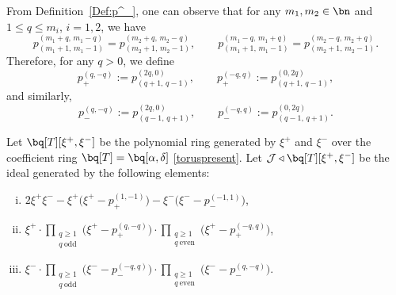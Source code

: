 \documentclass[10pt, a4paper, reqno]{amsart}
\begin{document}
%
%
%





	From Definition~\ref{Def:p^_}, one can observe that for any $m_1, m_2 \in \bn$ and $1 \leq q \leq m_i$, $i = 1, 2$, we have  
	\[
	p^{(m_1+q,\,m_1-q)}_{(m_1+1,\,m_1-1)} = p^{(m_2+q,\,m_2-q)}_{(m_2+1,\,m_2-1)}, 
	\qquad 
	p^{(m_1-q,\,m_1+q)}_{(m_1+1,\,m_1-1)} = p^{(m_2-q,\,m_2+q)}_{(m_2+1,\,m_2-1)}.
	\]
	Therefore, for any $q > 0$, we define 
	\[
	p^{(q,-q)}_{+} := p^{(2q,0)}_{(q+1,\,q-1)}, 
	\qquad 
	p^{(-q,q)}_{+} := p^{(0,2q)}_{(q+1,\,q-1)},
	\]
	and similarly, 
	\[
	p^{(q,-q)}_{-} := p^{(2q,0)}_{(q-1,\,q+1)}, 
	\qquad 
	p^{(-q,q)}_{-} := p^{(0,2q)}_{(q-1,\,q+1)}.
	\]

	Let $\bq[T][\xi^+,\xi^-]$ be the polynomial ring generated by $\xi^+$ and $\xi^-$ over the coefficient ring $\bq[T]=\bq[\alpha,\delta]$ \eqref{toruspresent}.   
	Let $\mathcal{J} \triangleleft \bq[T][\xi^+,\xi^-]$ be the ideal generated by the following elements:
	\begin{enumerate}[(i)]
		\item $2\xi^+\xi^- - \xi^+\big(\xi^+ - p^{(1,-1)}_{+}\big) - \xi^-\big(\xi^- - p^{(-1,1)}_{-}\big)$,
		\item $\xi^+ \cdot \displaystyle\prod_{\substack{q \ge 1\\ q~\text{odd}}}\!\big(\xi^+ - p^{(q,-q)}_{+}\big) 
		\cdot \!\!\!\!\!\prod_{\substack{q \ge 1\\ q~\text{even}}}\!\big(\xi^+ - p^{(-q,q)}_{+}\big)$,
		\item $\xi^- \cdot \displaystyle\prod_{\substack{q \ge 1\\ q~\text{odd}}}\!\big(\xi^- - p^{(-q,q)}_{-}\big) 
		\cdot \!\!\!\!\!\prod_{\substack{q \ge 1\\ q~\text{even}}}\!\big(\xi^- - p^{(q,-q)}_{-}\big)$.
	\end{enumerate}
\end{document}
